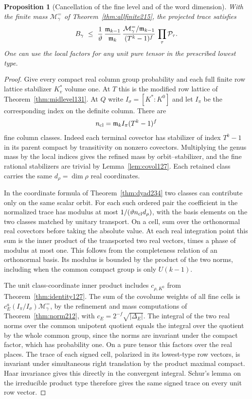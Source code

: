 \documentclass[a4paper,11pt]{article}
\newtheorem{proposition}{Proposition}[section]
\theoremstyle{definition}
\theoremstyle{remark}
\numberwithin{equation}{section}
\begin{document}
\begin{proposition}[Cancellation of the fine level and of the word dimension]\leavevmode
\label{prop:tracemass301}
With the finite mass \(\mathcal M_\gamma^{=}\) of
Theorem~\ref{thm:allfinite215}, the projected trace satisfies
\[
 B_\gamma\ \le\
 \frac{1}{\vartheta}\,
 \frac{\mathfrak m_{k-1}}{\mathfrak m_k}\,
 \frac{\mathcal M_\gamma^{=}/\mathfrak m_{k-1}}{(T^k-1)^f}\,
       \prod_\tau{\cal P}_\tau .
\]
One can use the local factors for any unit pure tensor in
the prescribed lowest type.
\end{proposition}
\begin{proof}
Give every compact real column group probability and each
full finite row lattice stabilizer \(K_v^*\) volume one.
At \(T\) this is the modified row lattice of
Theorem~\ref{thm:midlevel131}. At \(Q\) write
\(I_\sigma=[K^*:K^0]\) and let \(I_\pi\) be the corresponding
index on the definite column. There are
\[
             n_{\rm cl}=\mathfrak m_k I_\pi(T^k-1)^f
\]
fine column classes. Indeed each terminal covector has
stabilizer of index \(T^k-1\) in its parent compact by
transitivity on nonzero covectors. Multiplying the genus
mass by the local indices gives the refined mass by
orbit--stabilizer, and the fine rational stabilizers are
trivial by Lemma~\ref{lem:covol127}. Each retained class
carries the same \(d_\rho=\dim\rho\) real coordinates.

In the coordinate formula of Theorem~\ref{thm:dyad234} two
classes can contribute only on the same scalar orbit. For
each such ordered pair the coefficient in the normalized
trace has modulus at most \(1/(\vartheta n_{\rm cl}d_\rho)\),
with the basis elements on the two classes matched by
unitary transport. On a cell, sum over the orthonormal
real covectors before taking the absolute value. At each
real integration point this sum is the inner product of
the transported two real vectors, times a phase of modulus
at most one. This follows from the completeness relation
of an orthonormal basis. Its modulus is bounded by the
product of the two norms, including when the common
compact group is only \(U(k-1)\).

The unit class-coordinate inner product includes
\(c_{\rho,K^0}\) from Theorem~\ref{thm:identity127}. The
sum of the covolume weights of all fine cells is
\(c_E^a(I_\pi/I_\sigma)\mathcal M_\gamma^{=}\), by the
refinement and mass computations of Theorem~\ref{thm:norm212},
with \(c_E=2^{-f}\sqrt{|\Delta_E|}\). The integral of the
two real norms over the common unipotent quotient equals
the integral over the quotient by the whole common group,
since the norms are invariant under the compact factor, which
has probability one. On a pure tensor this factors over
the real places. The trace of each signed cell, polarized
in its lowest-type row vectors, is invariant under simultaneous
right translation by the product maximal compact. Haar
invariance gives this directly in the convergent integral.
Schur's lemma on the irreducible product type therefore
gives the same signed trace on every unit row vector.


\end{proof}
\end{document}
